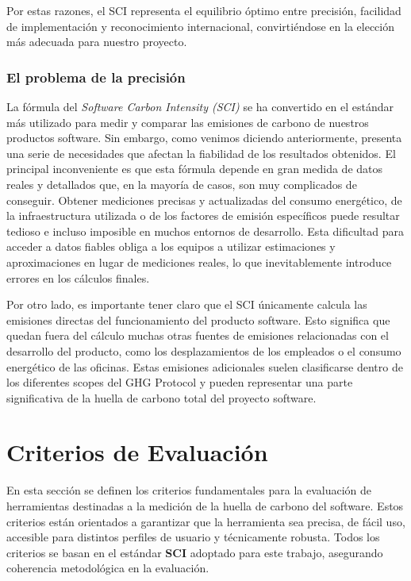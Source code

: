 \documentclass[12pt,a4paper]{report}
\begin{document}
Por estas razones, el SCI representa el equilibrio óptimo entre precisión, facilidad de implementación y reconocimiento internacional, convirtiéndose en la elección más adecuada para nuestro proyecto.

\subsubsection{El problema de la precisión}

La fórmula del \textit{Software Carbon Intensity (SCI)} se ha convertido en el estándar más utilizado para medir y comparar las emisiones de carbono de nuestros productos software. Sin embargo, como venimos diciendo anteriormente, presenta una serie de necesidades que afectan la fiabilidad de los resultados obtenidos. El principal inconveniente es que esta fórmula depende en gran medida de datos reales y detallados que, en la mayoría de casos, son muy complicados de conseguir. Obtener mediciones precisas y actualizadas del consumo energético, de la infraestructura utilizada o de los factores de emisión específicos puede resultar tedioso e incluso imposible en muchos entornos de desarrollo. Esta dificultad para acceder a datos fiables obliga a los equipos a utilizar estimaciones y aproximaciones en lugar de mediciones reales, lo que inevitablemente introduce errores en los cálculos finales.

Por otro lado, es importante tener claro que el SCI únicamente calcula las emisiones directas del funcionamiento del producto software. Esto significa que quedan fuera del cálculo muchas otras fuentes de emisiones relacionadas con el desarrollo del producto, como los desplazamientos de los empleados o el consumo energético de las oficinas. Estas emisiones adicionales suelen clasificarse dentro de los diferentes scopes del GHG Protocol y pueden representar una parte significativa de la huella de carbono total del proyecto software.

\section{Criterios de Evaluación}

En esta sección se definen los criterios fundamentales para la evaluación de herramientas destinadas a la medición de la huella de carbono del software. Estos criterios están orientados a garantizar que la herramienta sea precisa, de fácil uso, accesible para distintos perfiles de usuario y técnicamente robusta. Todos los criterios se basan en el estándar \textbf{SCI} adoptado para este trabajo, asegurando coherencia metodológica en la evaluación.
\end{document}
